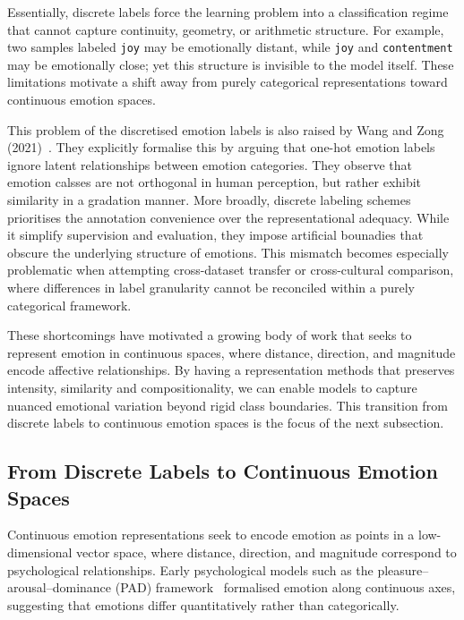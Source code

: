\documentclass[12pt,twoside]{report}
\begin{document}
Essentially, discrete labels force the learning problem into a classification regime that cannot capture continuity, geometry, or arithmetic structure. For example, two samples labeled \texttt{joy} may be emotionally distant, while \texttt{joy} and \texttt{contentment} may be emotionally close; yet this structure is invisible to the model itself. These limitations motivate a shift away from purely categorical representations toward continuous emotion spaces.

This problem of the discretised emotion labels is also raised  by Wang and Zong (2021)~\cite{wang-zong-2021-distributed}. They explicitly formalise this by arguing that one-hot emotion labels ignore latent relationships between emotion categories. They observe that emotion calsses are not orthogonal in human perception, but rather exhibit similarity in a gradation manner. More broadly, discrete labeling schemes prioritises  the annotation convenience over the representational adequacy. While it simplify supervision and evaluation, they impose artificial bounadies that obscure the underlying structure of emotions. This mismatch becomes especially problematic when attempting cross-dataset transfer or cross-cultural comparison, where differences in label granularity cannot be reconciled within a purely categorical framework.

These shortcomings have motivated a growing body of work that seeks to represent emotion in continuous spaces, where distance, direction, and magnitude encode affective relationships. By having a representation methods that preserves intensity, similarity and compositionality, we can enable models to capture nuanced emotional variation beyond rigid class boundaries. This transition from discrete labels to continuous emotion spaces is the focus of the next subsection.

\subsection{From Discrete Labels to Continuous Emotion Spaces}

Continuous emotion representations seek to encode emotion as points in a low-dimensional vector space, where distance, direction, and magnitude correspond to psychological relationships. Early psychological models such as the pleasure–arousal–dominance (PAD) framework~\cite{MehrabianRussell1974} formalised emotion along continuous axes, suggesting that emotions differ quantitatively rather than categorically.
\end{document}
